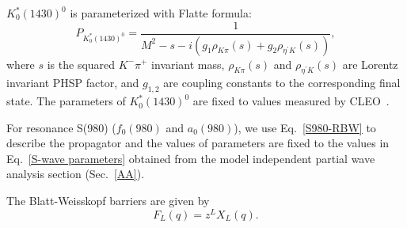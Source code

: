 \documentclass[aps,prd,twocolumn,showpacs,amsmath,amssymb]{revtex4-1}
\begin{document}
$K^{*}_{0}(1430)^{0}$ is parameterized with Flatte formula:
\begin{equation}
    P_{K^{*}_{0}(1430)^{0}}= \frac{1}{M^{2} - s - i(g_{1}\rho_{K\pi}(s) + g_{2}\rho_{\eta^{'}K}(s))}, \label{Flatte}
\end{equation}
where $s$ is the squared $K^{-}\pi^{+}$ invariant mass,  $\rho_{K\pi}(s)$ and $\rho_{\eta^{'}K}(s)$ are Lorentz invariant PHSP factor, and   $g_{1,2}$ are coupling constants to the corresponding final state. 
The parameters of $K^{*}_{0}(1430)^{0}$ are fixed to values measured by CLEO~\cite{CLEO-Flatte}. 

For resonance S(980) ($f_{0}(980)$ and $a_{0}(980)$), 
we use Eq.~\ref{S980-RBW} to describe the propagator 
and the values of parameters are fixed to the values in Eq.~\ref{S-wave parameters} 
obtained from the model independent partial wave analysis section (Sec.~\ref{AA}).


The Blatt-Weisskopf barriers are given by 
\begin{equation}
    F_{L}(q) = z^{L}X_{L}(q). 
    \label{Blatt-Weisskopf barrier} 
\end{equation}
\end{document}
